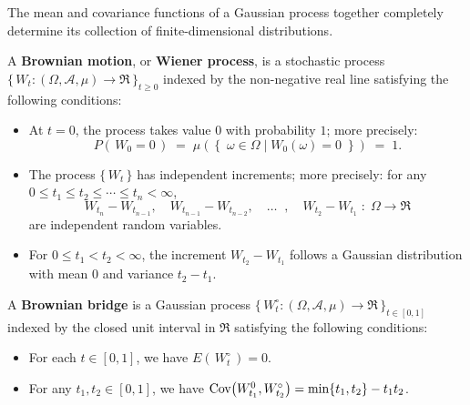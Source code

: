 \begin{theorem}
\mbox{}\vskip 0cm
\noindent
The mean and covariance functions of a Gaussian process together completely determine
its collection of finite-dimensional distributions.
\end{theorem}

\begin{definition}
\mbox{}\vskip 0.1cm
\noindent
A \textbf{Brownian motion}, or \textbf{Wiener process}, is a stochastic process
$\{\,W_{t} : \left(\Omega,\mathcal{A},\mu\right) \longrightarrow \Re\,\}_{t \geq 0}$ indexed by the non-negative real line
satisfying the following conditions:
\begin{itemize}
\item At $t = 0$, the process takes value $0$ with probability $1$; more precisely:
	\begin{equation*}
	P\!\left(\,W_{0} = 0\,\right)\; = \; \mu\!\left(\left\{\;\omega\in\Omega\;\vert\;W_{0}(\omega)=0\;\right\}\right) \; = \; 1.
	\end{equation*}
\item The process $\{\,W_{t}\,\}$ has independent increments; more precisely:
	for any $0 \leq t_{1} \leq t_{2} \leq \cdots \leq t_{n} < \infty$,
	\begin{equation*}
	W_{t_{n}} - W_{t_{n-1}}, 	\quad W_{t_{n-1}} - W_{t_{n-2}}, \quad \ldots \;\; , \quad W_{t_{2}} - W_{t_{1}}
	\; : \; \Omega \longrightarrow \Re
	\end{equation*}
	are independent random variables.
\item For $0 \leq t_{1} < t_{2} < \infty$, the increment $W_{t_{2}} - W_{t_{1}}$
	follows a Gaussian distribution with mean $0$ and variance $t_{2} - t_{1}$.
\end{itemize}
\end{definition}

\begin{definition}
\mbox{}\vskip 0.1cm
\noindent
A \textbf{Brownian bridge} is a Gaussian process
$\{\,W^{\circ}_{t} : \left(\Omega,\mathcal{A},\mu\right) \longrightarrow \Re\,\}_{t \in [0,1]}$
indexed by the closed unit interval in $\Re$ satisfying the following conditions:
\begin{itemize}
\item For each $t \in [0,1]$, we have $E\!\left(\,W^{\circ}_{t}\,\right) = 0$.
\item For any $t_{1}, t_{2} \in [0,1]$, we have $\textnormal{Cov}\!\left(W^{0}_{t_{1}},W^{\circ}_{t_{2}}\right) = \min\{t_{1},t_{2}\} - t_{1}t_{2}$.
\end{itemize}
\end{definition}

